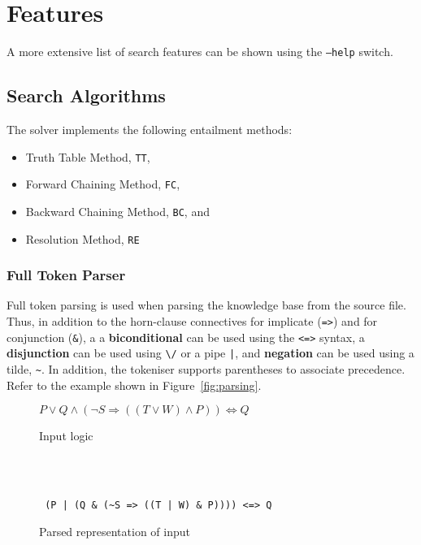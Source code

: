 \section{Features}

A more extensive list of search features can be shown using the \texttt{--help}
switch.

\subsection{Search Algorithms}
\label{sub:Search Algorithms}

The solver implements the following entailment methods:

\begin{itemize}
  \item Truth Table Method, \texttt{TT},
  \item Forward Chaining Method, \texttt{FC},
  \item Backward Chaining Method, \texttt{BC}, and
  \item Resolution Method, \texttt{RE}
\end{itemize}

\subsubsection{Full Token Parser}
\label{subs:tokenparser}

Full token parsing is used when parsing the knowledge base from the source file.
Thus, in addition to the horn-clause connectives for implicate (\texttt{=>}) and
for conjunction (\texttt{\&}), a a \textbf{biconditional} can be used using the
\texttt{<=>} syntax, a \textbf{disjunction} can be used using \texttt{\textbackslash/} or
a pipe \texttt{|}, and \textbf{negation} can be used using a tilde, \texttt{\textasciitilde}. In addition,
the tokeniser supports parentheses to associate precedence. Refer to the example
shown in Figure~\ref{fig:parsing}.

\begin{figure*}[h]
  \begin{subfigure}[b]{\textwidth}
    \centering
    $P \vee Q \wedge (\neg S \Rightarrow ((T \vee W) \wedge P)) \Leftrightarrow Q$
    \caption{Input logic}
    \label{fig:parsing-logic}
  \end{subfigure}\\\\
  \begin{subfigure}[b]{\textwidth}
    \centering
    \texttt{
      (P | (Q \& (\textasciitilde S => ((T | W) \& P)))) <=> Q
    }
    \caption{Parsed representation of input}
    \label{fig:parsing-parsed}
  \end{subfigure}
  \caption{Representation of full token parsing}
  \label{fig:parsing}
\end{figure*}

